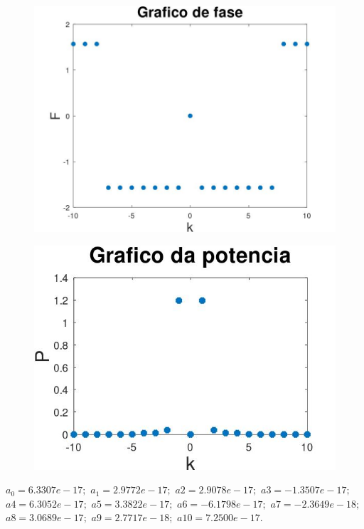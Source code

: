 \documentclass{article}
\begin{document}
\begin{figure}[h!]
    \includegraphics[scale=0.3]{plot4df}
    \centering
\end{figure}

\vspace{\baselineskip}

\begin{figure}[h!]
    \includegraphics[scale=0.43]{plot4dp}
    \centering
\end{figure}

\vspace{\baselineskip}

$a_{0} = 6.3307e-17;$
$a_{1} = 2.9772e-17;$
$a2 = 2.9078e-17;$
$a3 = -1.3507e-17;$
$a4 = 6.3052e-17;$
$a5 = 3.3822e-17;$
$a6 = -6.1798e-17;$
$a7 = -2.3649e-18;$
$a8 = 3.0689e-17;$
$a9 = 2.7717e-18;$
$a10 = 7.2500e-17.$
\end{document}
